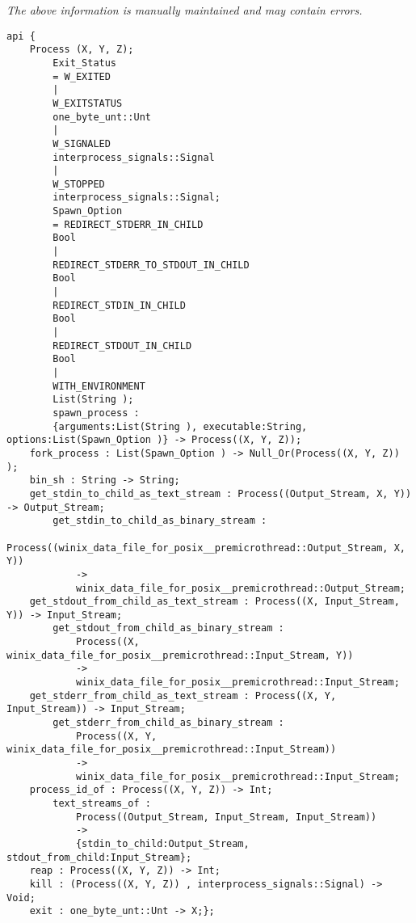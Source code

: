 \label{api:Spawn\_\_Premicrothread}

{\tiny \it The above information is manually maintained and may contain errors.}
\begin{verbatim}
api {
    Process (X, Y, Z);
        Exit_Status
        = W_EXITED
        |
        W_EXITSTATUS
        one_byte_unt::Unt
        |
        W_SIGNALED
        interprocess_signals::Signal
        |
        W_STOPPED
        interprocess_signals::Signal;
        Spawn_Option
        = REDIRECT_STDERR_IN_CHILD
        Bool
        |
        REDIRECT_STDERR_TO_STDOUT_IN_CHILD
        Bool
        |
        REDIRECT_STDIN_IN_CHILD
        Bool
        |
        REDIRECT_STDOUT_IN_CHILD
        Bool
        |
        WITH_ENVIRONMENT
        List(String );
        spawn_process :
        {arguments:List(String ), executable:String, options:List(Spawn_Option )} -> Process((X, Y, Z));
    fork_process : List(Spawn_Option ) -> Null_Or(Process((X, Y, Z)) );
    bin_sh : String -> String;
    get_stdin_to_child_as_text_stream : Process((Output_Stream, X, Y)) -> Output_Stream;
        get_stdin_to_child_as_binary_stream :
            Process((winix_data_file_for_posix__premicrothread::Output_Stream, X, Y))
            ->
            winix_data_file_for_posix__premicrothread::Output_Stream;
    get_stdout_from_child_as_text_stream : Process((X, Input_Stream, Y)) -> Input_Stream;
        get_stdout_from_child_as_binary_stream :
            Process((X, winix_data_file_for_posix__premicrothread::Input_Stream, Y))
            ->
            winix_data_file_for_posix__premicrothread::Input_Stream;
    get_stderr_from_child_as_text_stream : Process((X, Y, Input_Stream)) -> Input_Stream;
        get_stderr_from_child_as_binary_stream :
            Process((X, Y, winix_data_file_for_posix__premicrothread::Input_Stream))
            ->
            winix_data_file_for_posix__premicrothread::Input_Stream;
    process_id_of : Process((X, Y, Z)) -> Int;
        text_streams_of :
            Process((Output_Stream, Input_Stream, Input_Stream))
            ->
            {stdin_to_child:Output_Stream, stdout_from_child:Input_Stream};
    reap : Process((X, Y, Z)) -> Int;
    kill : (Process((X, Y, Z)) , interprocess_signals::Signal) -> Void;
    exit : one_byte_unt::Unt -> X;};
\end{verbatim}
